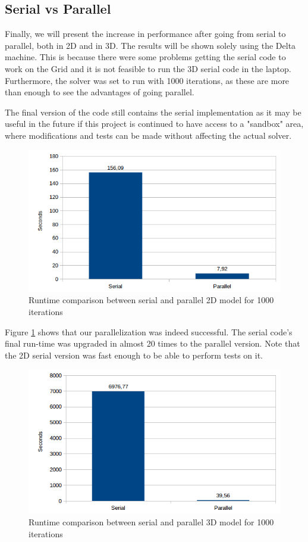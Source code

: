 \documentclass[12pt]{book}
\begin{document}
\subsection{Serial vs Parallel}
Finally, we will present the increase in performance after going from serial to parallel, both in 2D and in 3D. The results will be shown solely using the Delta machine. This is because there were some problems getting the serial code to work on the Grid and it is not feasible to run the 3D serial code in the laptop. Furthermore, the solver was set to run with 1000 iterations, as these are more than enough to see the advantages of going parallel. \par 
The final version of the code still contains the serial implementation as it may be useful in the future if this project is continued to have access to a "sandbox" area, where modifications and tests can be made without affecting the actual solver.

  \begin{figure}[H]
  	\centering
  	\includegraphics[width=\linewidth]{Resources/Images/serialDelta.png}
  	\caption{Runtime comparison between serial and parallel 2D model for 1000 iterations}
  	\label{fig:serial}
  \end{figure}
  
  Figure \ref{fig:serial} shows that our parallelization was indeed successful. The serial code's final run-time was upgraded in almost 20 times to the parallel version. Note that the 2D serial version was fast enough to be able to perform tests on it.
  
    \begin{figure}[H]
    	\centering
    	\includegraphics[width=0.8\linewidth]{Resources/Images/serialDelta3D.png}
    	\caption{Runtime comparison between serial and parallel 3D model for 1000 iterations}
    	\label{fig:serial3d}
    \end{figure}
    
\end{document}
